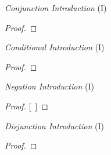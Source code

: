 				\vspace{-1em}
				
				\iffalse %
\begin{center}
\textit{Reiteration} (R) \vspace{-1em}
\begin{proof}
	\have[m]{a}{\metaA{}}
	\have[\ ]{c}{\metaA{}} \by{R}{a}
\end{proof}
\end{center}
\fi 

\begin{multicols}{2}


\textit{Conjunction Introduction} (\eand I) \vspace{-1em}
\begin{proof}
	 
	 
\end{proof}

\vspace{1em}

\textit{Conditional Introduction} (\eif I) \vspace{-1em}
\begin{proof}
	\open
	\close
\end{proof}

\vspace{0.6em}

\textit{Negation Introduction} (\enot I) \vspace{-1em}
\begin{proof}
\open
	\metaA{}    %
	\metaB{}
\close
{}[\ ]{\enot\metaA{}}
\end{proof}

\vspace{0.6em}

\textit{Disjunction Introduction} (\eor I) \vspace{-1em}

\begin{proof}
\end{proof}

\vspace{0.6em}


\end{multicols}
